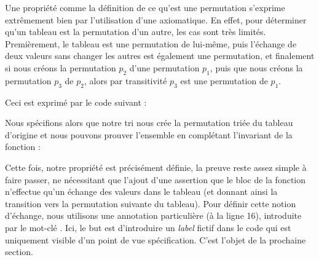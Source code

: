 Une propriété comme la définition de ce qu'est une permutation s'exprime 
extrêmement bien par l'utilisation d'une axiomatique. En effet, pour déterminer
qu'un tableau est la permutation d'un autre, les cas sont très limités. 
Premièrement, le tableau est une permutation de lui-même, puis l'échange de
deux valeurs sans changer les autres est également une permutation, et 
finalement si nous créons la permutation $p_2$ d'une permutation $p_1$, puis que 
nous créons la permutation $p_3$ de $p_2$, alors par transitivité $p_3$ est une
permutation de $p_1$.



Ceci est exprimé par le code suivant :






Nous spécifions alors que notre tri nous crée la permutation triée du tableau
d'origine et nous pouvons prouver l'ensemble en complétant l'invariant de la
fonction :





Cette fois, notre propriété est précisément définie, la preuve reste assez
simple à faire passer, ne nécessitant que l'ajout d'une assertion que le bloc
de la fonction n'effectue qu'un échange des valeurs dans le tableau (et donnant
ainsi la transition vers la permutation suivante du tableau). Pour définir cette
notion d'échange, nous utilisons une annotation particulière (à la ligne 16),
introduite par le mot-clé . Ici, le but est d'introduire un \textit{label} 
fictif dans le code qui est uniquement visible d'un point de vue spécification.
C'est l'objet de la prochaine section.

